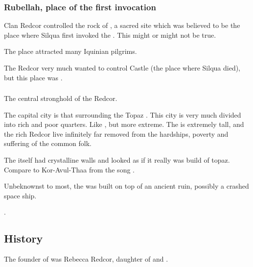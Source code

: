 \subsubsection{Rubellah, place of the first invocation}
Clan Redcor controlled the rock of , a sacred site which was believed to be the {place where Silqua first invoked the \sephiroth}.
This might or might not be true.

The place attracted many Iquinian pilgrims. 

The Redcor very much wanted to control Castle  (the {place where Silqua died}), but this place was .





\subsubsection{\TopazChateau}
\index{\TopazChateau}
The central stronghold of the Redcor. 

The capital city is that surrounding the Topaz \Chateau. This city is very much divided into rich and poor quarters. Like , but more extreme. The \Chateau{} is extremely tall, and the rich Redcor live infinitely far removed from the hardships, poverty and suffering of the common folk. 

The \Chateau itself had crystalline walls and looked as if it really was build of topaz. 
Compare to Kor-Avul-Thaa from the song . 

Unbeknownst to most, the \TopazChateau was built on top of an ancient \bane ruin, possibly a crashed space ship. 

\Belzir {}.









\subsection{History}
The founder of \ClanRedcor was Rebecca Redcor, daughter of  and . 





